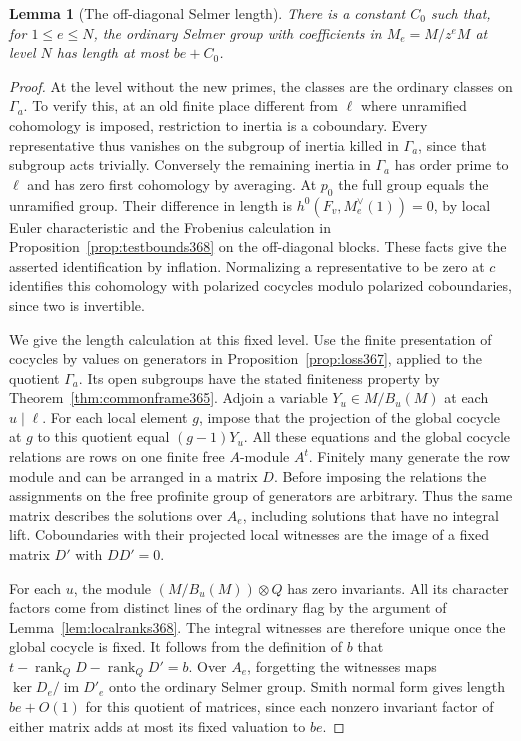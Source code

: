 \documentclass[a4paper,11pt]{article}
\newtheorem{lemma}[proposition]{Lemma}
\theoremstyle{definition}
\theoremstyle{remark}
\numberwithin{equation}{section}
\begin{document}
\begin{lemma}[The off-diagonal Selmer length]
\label{lem:odbase369}
There is a constant \(C_0\) such that, for \(1\le e\le N\),
the ordinary Selmer group with coefficients in \(M_e=M/z^eM\)
at level \(N\) has length at most \(be+C_0\).
\end{lemma}
\begin{proof}
At the level without the new primes, the classes are the
ordinary classes on \(\Gamma_a\). To verify this, at an old
finite place different from \(\ell\) where unramified
cohomology is imposed, restriction to inertia is a coboundary.
Every representative thus vanishes on the subgroup of inertia
killed in \(\Gamma_a\), since that subgroup acts trivially.
Conversely the remaining inertia in \(\Gamma_a\) has order
prime to \(\ell\) and has zero first cohomology by averaging.
At \(p_0\) the full group equals the unramified group.
Their difference in length is \(h^0(F_v,M_e^\vee(1))=0\),
by local Euler characteristic and the Frobenius calculation
in Proposition~\ref{prop:testbounds368} on the off-diagonal
blocks. These facts give the asserted identification by
inflation. Normalizing a representative to be zero at \(c\)
identifies this cohomology with polarized cocycles modulo
polarized coboundaries, since two is invertible.

We give the length calculation at this fixed level. Use the
finite presentation of cocycles by values on generators in
Proposition~\ref{prop:loss367}, applied to the quotient
\(\Gamma_a\). Its open subgroups have the stated finiteness
property by Theorem~\ref{thm:commonframe365}. Adjoin a variable
\(Y_u\in M/B_u(M)\) at each \(u\mid\ell\). For each local
element \(g\), impose that the projection of the global
cocycle at \(g\) to this quotient equal \((g-1)Y_u\).
All these equations and the global cocycle relations are
rows on one finite free \(A\)-module \(A^t\). Finitely many
generate the row module and can be arranged in a matrix \(D\).
Before imposing the relations the assignments on the free
profinite group of generators are arbitrary. Thus the same
matrix describes the solutions over \(A_e\), including
solutions that have no integral lift. Coboundaries with
their projected local witnesses are the image of a fixed
matrix \(D'\) with \(DD'=0\).

For each \(u\), the module \((M/B_u(M))\otimes Q\) has zero
invariants. All its character factors come from distinct
lines of the ordinary flag by the argument of
Lemma~\ref{lem:localranks368}. The integral witnesses
are therefore unique once the global cocycle is fixed.
It follows from the definition of \(b\) that
\(t-\operatorname{rank}_Q D-\operatorname{rank}_Q D'=b\).
Over \(A_e\), forgetting the witnesses maps
\(\ker D_e/\operatorname{im}D'_e\) onto the ordinary Selmer
group. Smith normal form gives length \(be+O(1)\) for this
quotient of matrices, since each nonzero invariant factor of
either matrix adds at most its fixed valuation to \(be\).


\end{proof}
\end{document}
